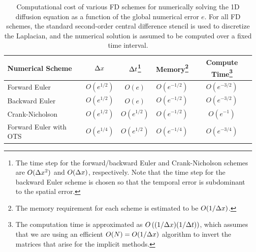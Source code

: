 \documentclass[oneeqnum,onefignum,onetabnum,onethmnum]{siamltex}
\begin{document}
\begin{table}[tbh]
\caption{\label{tab:comp_perf_vs_err} 
   Computational cost of various FD schemes for numerically solving the 1D 
   diffusion equation as a function of the global numerical error $e$.
   For all FD schemes, the standard second-order central difference 
   stencil is used to discretize the Laplacian, and the numerical 
   solution is assumed to be computed over a fixed time interval.  
}
\begin{minipage}{\textwidth}
\begin{center} \footnotesize
\renewcommand{\arraystretch}{1.5}
\begin{tabular}{|l|c|c|c|c|}
  \hline
  {\bf Numerical Scheme} & $\Delta x$ 
  & $\Delta t$\footnote{The 
   time step for the forward/backward Euler and Crank-Nicholson schemes 
   are $O(\Delta x^2)$ and $O(\Delta x)$, respectively.  Note that the 
   time step for the backward Euler scheme is chosen so that the temporal 
   error is subdominant to the spatial error.}
  & {\bf Memory}\footnote{The memory requirement for each scheme is estimated 
    to be $O(1/\Delta x)$.} 
  & {\bf Compute Time}\footnote{The computation time is approximated as 
    $O\left( (1/\Delta x) (1/\Delta t) \right)$, which assumes that we are using an 
    efficient $O(N) = O(1/\Delta x)$ algorithm to invert the matrices that 
    arise for the implicit methods.}  \\
  \hline 
  Forward Euler    & $O\left( e^{1/2} \right)$ 
                   & $O\left( e \right)$ 
                   & $O\left( e^{-1/2} \right)$ 
                   & $O\left( e^{-3/2} \right)$ \\
  Backward Euler   & $O\left( e^{1/2} \right)$ 
                   & $O\left( e \right)$ 
                   & $O\left( e^{-1/2} \right)$ 
                   & $O\left( e^{-3/2} \right)$ \\
  Crank-Nicholson  & $O\left( e^{1/2} \right)$ 
                   & $O\left( e^{1/2} \right)$ 
                   & $O\left( e^{-1/2} \right)$ 
                   & $O\left( e^{-1} \right)$ \\
  Forward Euler with OTS  & $O\left( e^{1/4} \right)$ 
                   & $O\left( e^{1/2} \right)$ 
                   & $O\left( e^{-1/4} \right)$ 
                   & $O\left( e^{-3/4} \right)$ \\ 
  \hline
\end{tabular}
\end{center}
\end{minipage}
\end{table}
\end{document}
